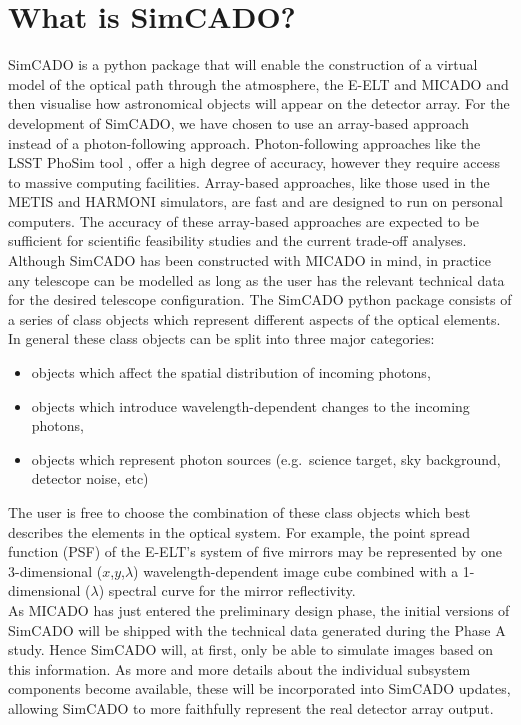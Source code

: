 \documentclass[11pt,twoside]{article}
\begin{document}
\section{What is SimCADO?}
SimCADO is a python package that will enable the construction of a virtual model of the optical path through the atmosphere, the E-ELT \citep{EELT} and MICADO \citep{MICADO} and then visualise how astronomical objects will appear on the detector array. For the development of SimCADO, we have chosen to use an array-based approach instead of a photon-following approach. Photon-following approaches like the LSST PhoSim tool \citep{PhoSim}, offer a high degree of accuracy, however they require access to massive computing facilities. Array-based approaches, like those used in the METIS \citep{METIS} and HARMONI \citep{HSim} simulators, are fast and are designed to run on personal computers. The accuracy of these array-based approaches are expected to be sufficient for scientific feasibility studies and the current trade-off analyses.\\

Although SimCADO has been constructed with MICADO in mind, in practice any telescope can be modelled as long as the user has the relevant technical data for the desired telescope configuration. The SimCADO python package consists of a series of class objects which represent different aspects of the optical elements. In general these class objects can be split into three major categories:

\begin{itemize}
\item objects which affect the spatial distribution of incoming photons,
\item objects which introduce wavelength-dependent changes to the incoming photons,
\item objects which represent photon sources (e.g.~science target, sky background, detector noise, etc)
\end{itemize}

The user is free to choose the combination of these class objects which best describes the elements in the optical system. For example, the point spread function (PSF) of the E-ELT's system of five mirrors may be represented by one 3-dimensional ($x$,$y$,$\lambda$) wavelength-dependent image cube combined with a 1-dimensional ($\lambda$) spectral curve for the mirror reflectivity.\\

As MICADO has just entered the preliminary design phase, the initial versions of SimCADO will be shipped with the technical data generated during the Phase A study. Hence SimCADO will, at first, only be able to simulate images based on this information. As more and more details about the individual subsystem components become available, these will be incorporated into SimCADO updates, allowing SimCADO to more faithfully represent the real detector array output.
\end{document}
